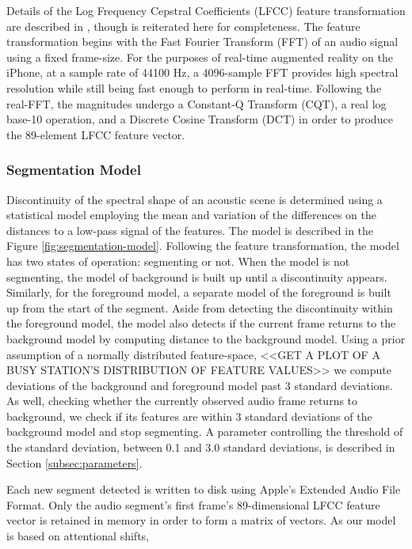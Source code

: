 \documentclass[a4paper,10pt,final]{ThesisStyle}
\begin{document}
Details of the Log Frequency Cepstral Coefficients (LFCC) feature transformation are described in \cite{CaseyICMC2007}, though is reiterated here for completeness.  The feature transformation begins with the Fast Fourier Transform (FFT) of an audio signal using a fixed frame-size.  For the purposes of real-time augmented reality on the iPhone, at a sample rate of 44100 Hz, a 4096-sample FFT provides high spectral resolution while still being fast enough to perform in real-time.  Following the real-FFT, the magnitudes undergo a Constant-Q Transform (CQT), a real log base-10 operation, and a Discrete Cosine Transform (DCT) in order to produce the 89-element LFCC feature vector.

\subsubsection{Segmentation Model}

Discontinuity of the spectral shape of an acoustic scene is determined using a statistical model employing the mean and variation of the differences on the distances to a low-pass signal of the features.  The model is described in the Figure \ref{fig:segmentation-model}.  Following the feature transformation, the model has two states of operation: segmenting or not.  When the model is not segmenting, the model of background is built up until a discontinuity appears.  Similarly, for the foreground model, a separate model of the foreground is built up from the start of the segment.  Aside from detecting the discontinuity within the foreground model, the model also detects if the current frame returns to the background model by computing distance to the background model.  Using a prior assumption of a normally distributed feature-space, <<GET A PLOT OF A BUSY STATION'S DISTRIBUTION OF FEATURE VALUES>> we compute deviations of the background and foreground model past 3 standard deviations.  As well, checking whether the currently observed audio frame returns to background, we check if its features are within 3 standard deviations of the background model and stop segmenting.  A parameter controlling the threshold of the standard deviation, between 0.1 and 3.0 standard deviations, is described in Section \ref{subsec:parameters}.

Each new segment detected is written to disk using Apple's Extended Audio File Format.  Only the audio segment's first frame's 89-dimensional LFCC feature vector is retained in memory in order to form a matrix of vectors.  As our model is based on attentional shifts,
\end{document}
